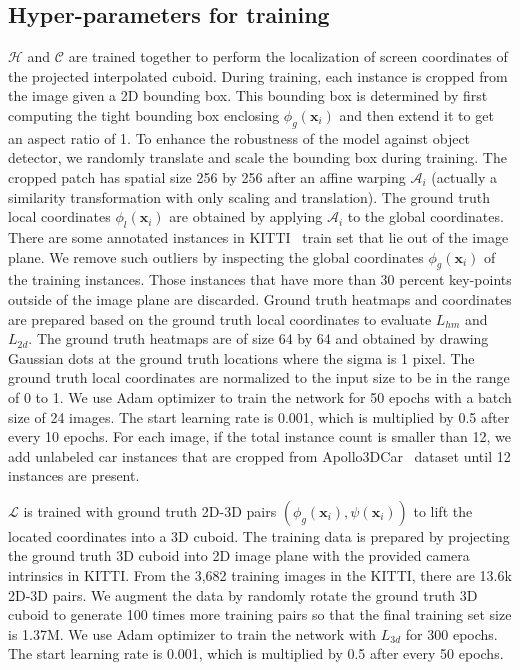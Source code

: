 \documentclass[final]{cvpr}
\begin{document}
\subsection{Hyper-parameters for training}
$\mathcal{H}$ and $\mathcal{C}$ are trained together to perform the localization of screen coordinates of the projected interpolated cuboid. During training, each instance is cropped from the image given a 2D bounding box. This bounding box is determined by first computing the tight bounding box enclosing $\phi_g(\mathbf{x}_i)$ and then extend it to get an aspect ratio of 1. To enhance the robustness of the model against object detector, we randomly translate and scale the bounding box during training. The cropped patch has spatial size 256 by 256 after an affine warping $\mathcal{A}_i$ (actually a similarity transformation with only scaling and translation). The ground truth local coordinates $\phi_l(\mathbf{x}_i)$ are obtained by applying $\mathcal{A}_i$ to the global coordinates. There are some annotated instances in KITTI~\cite{geiger2012we} train set that lie out of the image plane. We remove such outliers by inspecting the global coordinates $\phi_g(\mathbf{x}_i)$ of the training instances. Those instances that have more than 30 percent key-points outside of the image plane are discarded. Ground truth heatmaps and coordinates are prepared based on the ground truth local coordinates to evaluate $L_{hm}$ and $L_{2d}$. The ground truth heatmaps are of size 64 by 64 and obtained by drawing Gaussian dots at the ground truth locations where the sigma is 1 pixel. The ground truth local coordinates are normalized to the input size to be in the range of 0 to 1. We use Adam optimizer to train the network for 50 epochs with a batch size of 24 images. The start learning rate is 0.001, which is multiplied by 0.5 after every 10 epochs. For each image, if the total instance count is smaller than 12, we add unlabeled car instances that are cropped from Apollo3DCar~\cite{song2019apollocar3d} dataset until 12 instances are present. 

$\mathcal{L}$ is trained with ground truth 2D-3D pairs $(\phi_g(\mathbf{x}_i), \psi(\mathbf{x}_i))$ to lift the located coordinates into a 3D cuboid. The training data is prepared by projecting the ground truth 3D cuboid into 2D image plane with the provided camera intrinsics in KITTI. From the 3,682 training images in the KITTI, there are 13.6k 2D-3D pairs. We augment the data by randomly rotate the ground truth 3D cuboid to generate 100 times more training pairs so that the final training set size is 1.37M. We use Adam optimizer to train the network with $L_{3d}$ for 300 epochs. The start learning rate is 0.001, which is multiplied by 0.5 after every 50 epochs.
\end{document}

